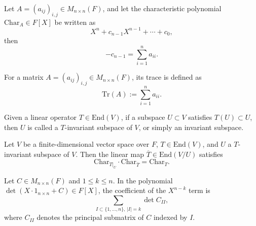 \begin{lemma}
Let $A = (a_{ij})_{i,j} \in M_{n \times n}(F)$, and let the characteristic polynomial $\mathrm{Char}_A \in F[X]$ be written as
\[
X^n + c_{n-1} X^{n-1} + \cdots + c_0,
\]
then
\[
- c_{n-1} = \sum_{i=1}^n a_{ii}.
\]
\end{lemma}

\begin{definition}[Trace]
For a matrix $A = (a_{ij})_{i,j} \in M_{n \times n}(F)$, its trace is defined as
\[
\mathrm{Tr}(A) := \sum_{i=1}^n a_{ii}.
\]
\end{definition}

\begin{definition}
Given a linear operator $T \in \mathrm{End}(V)$, if a subspace $U \subset V$ satisfies $T(U) \subset U$, then $U$ is called a $T$-invariant subspace of $V$, or simply an invariant subspace.
\end{definition}

\begin{proposition}
Let $V$ be a finite-dimensional vector space over $F$, $T \in \mathrm{End}(V)$, and $U$ a $T$-invariant subspace of $V$. Then the linear map $\overline{T} \in \mathrm{End}(V/U)$ satisfies
\[
\mathrm{Char}_{T|_U} \cdot \mathrm{Char}_{\overline{T}} = \mathrm{Char}_{T}.
\]
\end{proposition}

\begin{lemma}
Let $C \in M_{n \times n}(F)$ and $1 \leq k \leq n$. In the polynomial $\det(X \cdot 1_{n \times n} + C) \in F[X]$, the coefficient of the $X^{n-k}$ term is
\[
\sum_{I \subset \{1, \ldots, n\},\, |I| = k} \det C_{I I},
\]
where $C_{I I}$ denotes the principal submatrix of $C$ indexed by $I$.
\end{lemma}